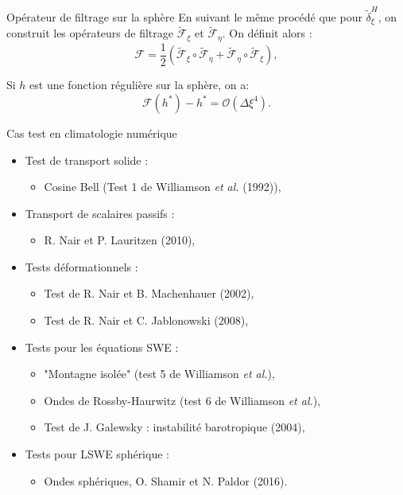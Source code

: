 \documentclass[11pt]{beamer}
\def\dxi{\tilde{\delta}^H_{\xi}}
\def\fxi{\tilde{\mathcal{F}}_{\xi}}
\def\feta{\tilde{\mathcal{F}}_{\eta}}
\begin{document}
\begin{frame}{Opérateur de filtrage sur la sphère}
En suivant le même procédé que pour $\dxi$, on construit les opérateurs de filtrage $\fxi$ et $\feta$. On définit alors :
$$
\mathcal{F} = \dfrac{1}{2} \left( \fxi \circ \feta + \feta \circ \fxi \right),
$$
\begin{block}{}
Si $h$ est une fonction régulière sur la sphère, on a:
$$
\mathcal{F}(h^*) - h^* = \mathcal{O} \left( \Delta \xi^4 \right).
$$
\end{block}
\end{frame}











\begin{frame}{Cas test en climatologie numérique}
\begin{itemize}
\item Test de transport solide :
\begin{itemize}
\item Cosine Bell (Test 1 de Williamson \textit{et al.} (1992)),
\end{itemize}
\item Transport de scalaires passifs :
\begin{itemize}
\item R. Nair et P. Lauritzen (2010),
\end{itemize}
\item Tests déformationnels :
\begin{itemize}
\item Test de R. Nair et B. Machenhauer (2002),
\item Test de R. Nair et C. Jablonowski (2008),
\end{itemize}
\item Tests pour les équations SWE :
\begin{itemize}
\item "Montagne isolée" (test 5 de  Williamson \textit{et al.}),
\item Ondes de Rossby-Haurwitz (test 6 de  Williamson \textit{et al.}),
\item Test de J. Galewsky : instabilité barotropique (2004),
\end{itemize}
\item Tests pour LSWE sphérique :
\begin{itemize}
\item Ondes sphériques, O. Shamir et N. Paldor (2016).
\end{itemize}
\end{itemize}
\end{frame}
\end{document}
